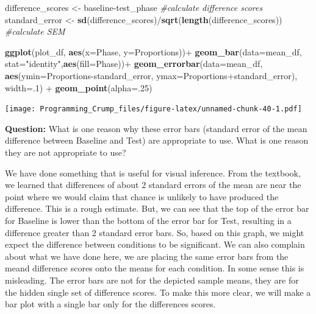 \documentclass[]{book}
\newenvironment{Shaded}{\begin{snugshade}}{\end{snugshade}}
\newcommand{\KeywordTok}[1]{\textcolor[rgb]{0.13,0.29,0.53}{\textbf{{#1}}}}
\newcommand{\DataTypeTok}[1]{\textcolor[rgb]{0.13,0.29,0.53}{{#1}}}
\newcommand{\DecValTok}[1]{\textcolor[rgb]{0.00,0.00,0.81}{{#1}}}
\newcommand{\StringTok}[1]{\textcolor[rgb]{0.31,0.60,0.02}{{#1}}}
\newcommand{\CommentTok}[1]{\textcolor[rgb]{0.56,0.35,0.01}{\textit{{#1}}}}
\newcommand{\NormalTok}[1]{{#1}}
\theoremstyle{definition}
\theoremstyle{definition}
\theoremstyle{definition}
\theoremstyle{remark}
\begin{document}
\begin{Shaded}
\begin{Highlighting}[]
\NormalTok{difference_scores <-}\StringTok{ }\NormalTok{baseline-test_phase }\CommentTok{#calculate difference scores}
\NormalTok{standard_error <-}\StringTok{ }\KeywordTok{sd}\NormalTok{(difference_scores)/}\KeywordTok{sqrt}\NormalTok{(}\KeywordTok{length}\NormalTok{(difference_scores)) }\CommentTok{#calculate SEM}


\KeywordTok{ggplot}\NormalTok{(plot_df, }\KeywordTok{aes}\NormalTok{(}\DataTypeTok{x=}\NormalTok{Phase, }\DataTypeTok{y=}\NormalTok{Proportions))+}\StringTok{ }
\StringTok{  }\KeywordTok{geom_bar}\NormalTok{(}\DataTypeTok{data=}\NormalTok{mean_df, }\DataTypeTok{stat=}\StringTok{"identity"}\NormalTok{,}\KeywordTok{aes}\NormalTok{(}\DataTypeTok{fill=}\NormalTok{Phase))+}
\StringTok{  }\KeywordTok{geom_errorbar}\NormalTok{(}\DataTypeTok{data=}\NormalTok{mean_df, }\KeywordTok{aes}\NormalTok{(}\DataTypeTok{ymin=}\NormalTok{Proportions-standard_error, }
                                  \DataTypeTok{ymax=}\NormalTok{Proportions+standard_error), }\DataTypeTok{width=}\NormalTok{.}\DecValTok{1}\NormalTok{) +}
\StringTok{  }\KeywordTok{geom_point}\NormalTok{(}\DataTypeTok{alpha=}\NormalTok{.}\DecValTok{25}\NormalTok{)}
\end{Highlighting}
\end{Shaded}

\texttt{[image: Programming\_Crump\_files/figure-latex/unnamed-chunk-40-1.pdf]}

\textbf{Question:} What is one reason why these error bars (standard
error of the mean difference between Baseline and Test) are appropriate
to use. What is one reason they are not appropriate to use?

We have done something that is useful for visual inference. From the
textbook, we learned that differences of about 2 standard errors of the
mean are near the point where we would claim that chance is unlikely to
have produced the difference. This is a rough estimate. But, we can see
that the top of the error bar for Baseline is lower than the bottom of
the error bar for Test, resulting in a difference greater than 2
standard error bars. So, based on this graph, we might expect the
difference between conditions to be significant. We can also complain
about what we have done here, we are placing the same error bars from
the meand difference scores onto the means for each condition. In some
sense this is misleading. The error bars are not for the depicted sample
means, they are for the hidden single set of difference scores. To make
this more clear, we will make a bar plot with a single bar only for the
differences scores.
\end{document}
